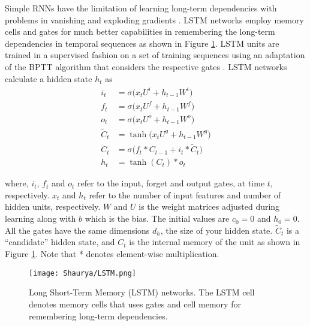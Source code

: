 \documentclass{ieeeaccess}
\begin{document}
 Simple RNNs have the \cite{hochreiter1997long} limitation of learning long-term dependencies with problems in vanishing and exploding gradients  \cite{hochreiter1998vanishing}. LSTM networks employ  memory cells and gates for much better capabilities in remembering the   long-term dependencies   in temporal sequences   as shown in Figure \ref{fig:LSTM}. LSTM units are trained in a supervised fashion on a set of training sequences  using an adaptation of the BPTT algorithm that considers the respective gates \cite{hochreiter1997long}.   LSTM networks calculate a hidden state  $h_{t}$ as
 \begin{equation}
 \begin{aligned}
    i_{t} & =\sigma\big(x_{t}U^{i}+h_{t-1}W^{i}\big)\\
    f_{t} & =\sigma\big(x_{t}U^{f}+h_{t-1}W^{f}\big)\\
    o_{t} & =\sigma\big(x_{t}U^{o}+h_{t-1}W^{o}\big)\\
    \tilde{C}_{t} & =\tanh\big(x_{t}U^{g}+h_{t-1}W^{g}\big)\\
    C_{t} & =\sigma\big(f_{t}\ast C_{t-1}+i_{t}\ast\tilde{C}_{t}\big)\\
    h_{t} & =\tanh(C_{t})\ast o_{t}
\end{aligned}
\end{equation}

 where,  $i_t$, $f_t$ and $o_t$ refer to the input, forget and output gates, at time $t$, respectively.  $x_t$ and  $h_t$ refer to the number of input features and number of hidden units, respectively. $W$   and $U$ is the weight matrices adjusted during learning along with  $b$ which is the bias.   The initial values are $c_{0}=0$ and   $h_{0}=0$. All the gates have the same dimensions $d_h$, the size of your hidden state. $\tilde{C}_t$ is a “candidate” hidden state, and  $C_t$ is the internal memory of the unit as shown in Figure \ref{fig:LSTM}.  Note that *  denotes element-wise multiplication.


 
\begin{figure}[htbp!]
  \begin{center}  
   \texttt{[image: Shaurya/LSTM.png]} 
    \caption{ Long Short-Term Memory (LSTM)   networks. The LSTM cell denotes  memory cells that uses gates and cell memory for remembering long-term dependencies. 
}
 \label{fig:LSTM}
  \end{center}
\end{figure}
\end{document}
